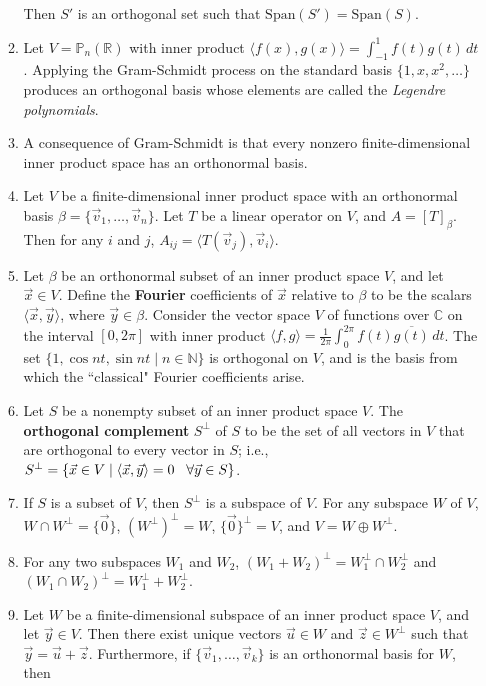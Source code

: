 \documentclass[10pt]{article}
\begin{document}
\begin{multicols*}{2}
\begin{enumerate}
\begin{enumerate}
\begin{align*}
        \end{align*}
        Then $S'$ is an orthogonal set such that $\text{Span}(S')=\text{Span}(S)$.
        \item Let $V=\mathbb{P}_n(\mathbb{R})$ with inner product $\langle f(x), g(x) \rangle = \int_{-1}^{1} f(t) g(t) \,dt$. Applying the Gram-Schmidt process on the standard basis $\{1, x, x^2, \hdots \}$ produces an orthogonal basis whose elements are called the \textit{Legendre polynomials}.
        \item A consequence of Gram-Schmidt is that every nonzero finite-dimensional inner product space has an orthonormal basis.
        \item Let $V$ be a finite-dimensional inner product space with an orthonormal basis $\beta = \{ \vec{v}_1, \hdots, \vec{v}_n \}$. Let $T$ be a linear operator on $V$, and $A=[T]_\beta$. Then for any $i$ and $j$, $A_{ij} = \langle T(\vec{v}_j), \vec{v}_i \rangle$.
        \item Let $\beta$ be an orthonormal subset of an inner product space $V$, and let $\vec{x}\in V$. Define the \textbf{Fourier} coefficients of $\vec{x}$ relative to $\beta$ to be the scalars $\langle \vec{x}, \vec{y} \rangle$, where $\vec{y}\in \beta$. Consider the vector space $V$ of functions over $\mathbb{C}$ on the interval $[0,2\pi]$ with inner product $\langle f, g \rangle = \frac{1}{2\pi} \int_0^{2\pi} f(t) \overline{g(t)} \,dt$. The set $\{ 1, \cos{nt}, \sin{nt} \mid n \in \mathbb{N} \}$ is orthogonal on $V$, and is the basis from which the ``classical" Fourier coefficients arise.
        \item Let $S$ be a nonempty subset of an inner product space $V$. The \textbf{orthogonal complement} $S^\perp$ of $S$ to be the set of all vectors in $V$ that are orthogonal to every vector in $S$; i.e., $S^\perp = \{ \vec{x} \in V \mid \langle \vec{x}, \vec{y} \rangle = 0 \hspace{3mm} \forall \vec{y} \in S \}$. 
        \item If $S$ is a subset of $V$, then $S^\perp$ is a subspace of $V$. For any subspace $W$ of $V$, $W \cap W^\perp = \{ \vec{0} \}$, $(W^\perp)^\perp = W$, $\{ \vec{0} \}^\perp = V$, and $V = W \oplus W^\perp$.
        \item For any two subspaces $W_1$ and $W_2$, $(W_1 + W_2)^\perp = W_1^\perp \cap W_2^\perp$ and $(W_1 \cap W_2)^\perp = W_1^\perp + W_2^\perp$. 
        \item Let $W$ be a finite-dimensional subspace of an inner product space $V$, and let $\vec{y} \in V$. Then there exist unique vectors $\vec{u} \in W$ and $\vec{z} \in W^\perp$ such that $\vec{y} = \vec{u} + \vec{z}$. Furthermore, if $\{ \vec{v}_1, \hdots, \vec{v}_k \}$ is an orthonormal basis for $W$, then

\end{enumerate}
\end{enumerate}
\end{multicols*}
\end{document}
